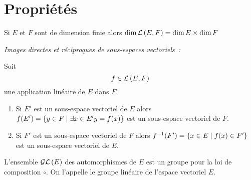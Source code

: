 \section{Propriétés}
\begin{prop}
Si $E$ et $F$ sont de dimension finie alors \(\dim\mathcal{L}\left(E,F\right)=\dim{E} \times \dim{F}\)
\end{prop}

\emph{Images directes et réciproques de sous-espaces vectoriels~:}
\begin{prop}
Soit \[f \in \mathcal{L}\left(E,F\right)\] une application linéaire de $E$ dans $F$.
\begin{enumerate}
\item Si $E'$ est un sous-espace vectoriel de $E$ alors $f(E') = \left\{y \in F\mathrel{}\middle|\mathrel{}\exists x \in E' y=f(x)\right\}$ est un sous-espace vectoriel de $F$.
\item Si $F'$ est un sous-espace vectoriel de $F$ alors $f^{-1}(F') =  \left\{x \in E\mathrel{}\middle|\mathrel{}f(x) \in F'\right\}$ est un sous-espace vectoriel de $E$.
\end{enumerate}
\end{prop}

\begin{prop}
L'ensemble $\mathcal{GL}\left(E\right)$ des automorphismes de $E$ est un groupe pour la loi de composition $\circ$. On l'appelle le groupe linéaire de l'espace vectoriel $E$.
\end{prop} 
